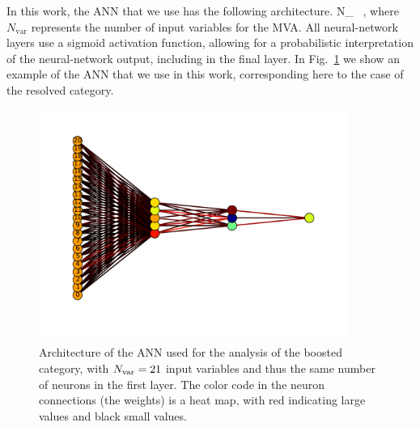 In this work, the ANN that we use has the following architecture.
\be
\label{eq:nn1}
N_{} \, ,
\ee
where $N_{\mathrm{var}}$ represents the number of input variables for the MVA.
All neural-network layers use a sigmoid activation function, allowing
for a probabilistic
interpretation of the neural-network output, including in the final layer.
%
In Fig.~\ref{fig:nnarch} we show an example of the ANN that we use in this work, corresponding here
to the case of the resolved category.

\begin{figure}[t]
  \begin{center}
      \vspace{-1cm}
  \includegraphics[width=0.90\textwidth]{plots/bst_nnarch_noPU.pdf}
  \vspace{-1cm}
  \caption{\small Architecture of the ANN used for the analysis of the
    boosted
    category, with $N_{\rm var}=21$ input variables and thus
    the same number of neurons
  in the first layer.
  The color code in the neuron connections (the weights) is a heat map,
  with red indicating large values and black small values.
}
\label{fig:nnarch}
\end{center}
\end{figure}


